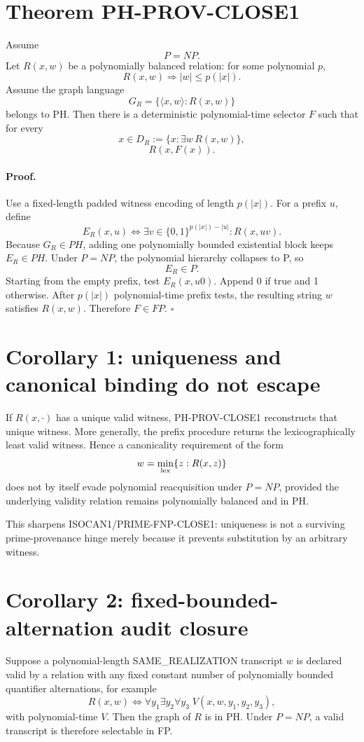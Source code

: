 \documentclass[11pt]{article}
\begin{document}
\section*{Theorem PH-PROV-CLOSE1}
Assume
\[
P=NP.
\]
Let \(R(x,w)\) be a polynomially balanced relation: for some polynomial \(p\),
\[
R(x,w)\Longrightarrow |w|\le p(|x|).
\]
Assume the graph language
\[
G_R=\{\langle x,w\rangle:R(x,w)\}
\]
belongs to PH. Then there is a deterministic polynomial-time selector \(F\) such that for every
\[
x\in D_R:=\{x:\exists w\,R(x,w)\},
\]
\[
\boxed{R(x,F(x)).}
\]

\paragraph{Proof.}
Use a fixed-length padded witness encoding of length \(p(|x|)\). For a prefix \(u\), define
\[
E_R(x,u)
\iff
\exists v\in\{0,1\}^{p(|x|)-|u|}:R(x,uv).
\]
Because \(G_R\in PH\), adding one polynomially bounded existential block keeps
\(E_R\in PH\). Under \(P=NP\), the polynomial hierarchy collapses to P, so
\[
E_R\in P.
\]
Starting from the empty prefix, test \(E_R(x,u0)\). Append 0 if true and 1 otherwise.
After \(p(|x|)\) polynomial-time prefix tests, the resulting string \(w\) satisfies
\(R(x,w)\). Therefore \(F\in FP\). \(\square\)

\section*{Corollary 1: uniqueness and canonical binding do not escape}
If \(R(x,\cdot)\) has a unique valid witness, PH-PROV-CLOSE1 reconstructs that unique witness.
More generally, the prefix procedure returns the lexicographically least valid witness. Hence a
canonicality requirement of the form
\[
w=\min_{\rm lex}\{z:R(x,z)\}
\]
does not by itself evade polynomial reacquisition under \(P=NP\), provided the underlying
validity relation remains polynomially balanced and in PH.

This sharpens ISOCAN1/PRIME-FNP-CLOSE1: uniqueness is not a surviving prime-provenance hinge merely
because it prevents substitution by an arbitrary witness.

\section*{Corollary 2: fixed-bounded-alternation audit closure}
Suppose a polynomial-length SAME\_REALIZATION transcript \(w\) is declared valid by a relation
with any fixed constant number of polynomially bounded quantifier alternations, for example
\[
R(x,w)
\iff
\forall y_1\exists y_2\forall y_3\;V(x,w,y_1,y_2,y_3),
\]
with polynomial-time \(V\). Then the graph of \(R\) is in PH. Under \(P=NP\), a valid
transcript is therefore selectable in FP.
\end{document}
